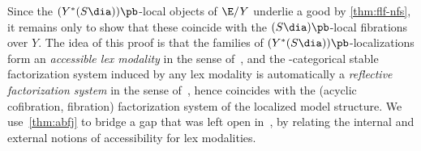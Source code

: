 Since the $(Y^*(S\dia))\pb$-local objects of $\E/Y$ underlie a good \nfs by \cref{thm:flf-nfs}, it remains only to show that these coincide with the $(S\dia)\pb$-local fibrations over $Y$.
The idea of this proof is that the families of $(Y^*(S\dia))\pb$-localizations form an \emph{accessible lex modality} in the sense of~\cite{rss:modalities}, and the \io-categorical stable factorization system induced by any lex modality is automatically a \emph{reflective factorization system} in the sense of~\cite{chk:reflocfact}, hence coincides with the (acyclic cofibration, fibration) factorization system of the localized model structure.
We use~\cref{thm:abfj} to bridge a gap that was left open in~\cite{rss:modalities}, by relating the internal and external notions of accessibility for lex modalities.


